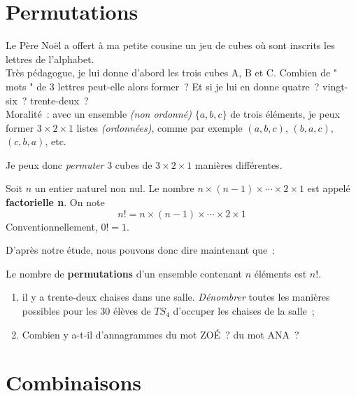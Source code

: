 \documentclass[french]{book}
\begin{document}
\section{Permutations}

Le Père Noël a offert à ma petite cousine un jeu de cubes
où sont inscrits les lettres de l'alphabet.\\

Très pédagogue, je lui donne d'abord les trois cubes A, B et C.
Combien de " mots " de 3 lettres peut-elle alors former~? Et si
je lui en donne quatre~? vingt-six~? trente-deux~?\\


Moralité~: avec un ensemble \textit{(non ordonné)} $\{a,b,c\}$ de
trois éléments, je peux former $3\times 2\times 1$ listes
\textit{(ordonnées)}, comme par exemple $(a,b,c)$, $(b,a,c)$,
$(c,b,a)$, etc.

Je peux donc \textit{permuter} 3 cubes de $3\times 2\times 1$
manières différentes.

\begin{defn}[factorielle]
  Soit $n$ un entier naturel non nul. Le nombre $n\times(n-1)\times\cdots\times2\times1$ est appelé \textbf{factorielle n}. On
note
$$n!=n\times(n-1)\times\cdots\times2\times1$$
Conventionnellement, $0!=1$.
\end{defn}



D'après notre étude, nous pouvons donc dire maintenant que~:


\begin{thm}
  Le nombre de \textbf{permutations} d'un ensemble contenant $n$ éléments est $n!$.
\end{thm}


\begin{exemple}[]
  \begin{enumerate}
  \item il y a trente-deux chaises dans une salle.
\textit{Dénombrer} toutes les manières possibles pour les 30 élèves
de $TS_4$ d'occuper les chaises de la salle~;
\item Combien y a-t-il d'annagrammes du mot ZO\'E~? du mot ANA~?
  \end{enumerate}
\end{exemple}


\section{Combinaisons}
\end{document}

